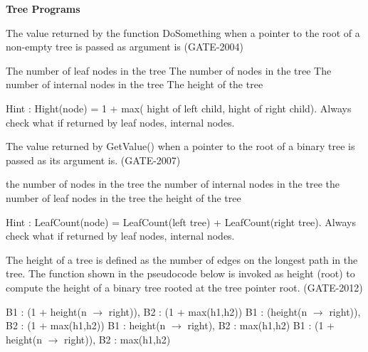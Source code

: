 
\centerline{\textbf{ \LARGE Tree Programs}}

\begin{questyle}
  \question  The value returned by the function DoSomething when a pointer to the root of a non-empty
             tree is passed as argument is  (GATE-2004)
    

  \begin{choices}
    \choice         The number of leaf nodes in the tree
    \choice         The number of nodes in the tree
    \choice         The number of internal nodes in the tree
    \CorrectChoice  The height of the tree
  \end{choices}
  Hint : Hight(node) = 1 + max( hight of left child, hight of right child).  Always check what if returned by leaf nodes, internal nodes.
\end{questyle}

\begin{questyle}
  \question  The value returned by GetValue() when a pointer to the root of a binary tree is passed as its argument is.  (GATE-2007)
    

  \begin{choices}
    \choice         the number of nodes in the tree
    \choice         the number of internal nodes in the tree
    \CorrectChoice  the number of leaf nodes in the tree
    \choice         the height of the tree
  \end{choices}
  Hint : LeafCount(node) = LeafCount(left tree) + LeafCount(right tree). Always check what if returned by leaf nodes, internal nodes.
\end{questyle}

\begin{questyle}
  \question  The height of a tree is defined as the number of edges on the longest path in the tree. The function
              shown in the pseudocode below is invoked as height (root) to compute the height of a binary tree
              rooted at the tree pointer root.   (GATE-2012)
            
  \begin{choices}
    \CorrectChoice  B1 : (1 + height(n \(\rightarrow\) right)), \qquad B2 : (1 + max(h1,h2))
    \choice         B1 : (height(n \(\rightarrow\) right)), \qquad B2 : (1 + max(h1,h2))
    \choice         B1 : height(n \(\rightarrow\) right), \qquad B2 : max(h1,h2)
    \choice         B1 : (1 + height(n \(\rightarrow\) right)), \qquad B2 : max(h1,h2)
  \end{choices}
\end{questyle}

